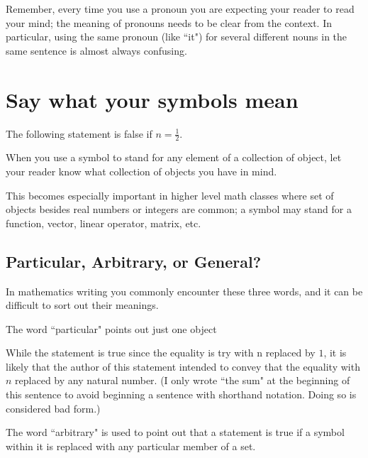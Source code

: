 \documentclass[12pt]{article}
\def\thup{\rightthumbsup}
\def\thdn{\rightthumbsdown}
\begin{document}
Remember, every time you use a pronoun you are expecting your reader to read your mind; the meaning of pronouns needs to be clear from the context. In particular, using the same pronoun (like ``it") for several different nouns in the same sentence is almost always confusing. 

\section{Say what your symbols mean}
The following statement is false if  $n=\frac12$.
\begin{center}
\thdn
\end{center}
When you use a symbol to stand for any element of a collection of object, let your reader know what collection of objects you have in mind. 
\begin{center}
\thup
\end{center}
This becomes especially important in higher level math classes where set of objects besides real numbers or integers are common; a symbol may stand for a function, vector, linear operator, matrix, etc.

\subsection{Particular, Arbitrary, or General?}

In mathematics writing you commonly encounter these three words, and it can be difficult to sort out their meanings.

The word ``particular" points out just one object
\begin{center}
\thdn
\end{center}
While the statement is true since the equality is try with n replaced by $1$, it is likely that the author of this statement intended to convey that the equality with $n$ replaced by any natural number. (I only wrote ``the sum" at the beginning of this sentence to avoid beginning a sentence with shorthand notation. Doing so is considered bad form.)
\begin{center}
\thup
\end{center}

The word ``arbitrary" is used to point out that a statement is true if a symbol within it is replaced with any particular member of a set.
\end{document}
